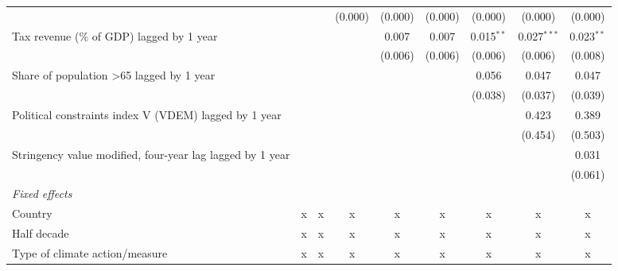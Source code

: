 \begin{tabular}{lcccccccc}
                                                                     &              &              & (0.000)      & (0.000) & (0.000) & (0.000)        & (0.000)        & (0.000)\\   
   Tax revenue (\% of GDP) lagged by 1 year                          &              &              &              & 0.007   & 0.007   & 0.015$^{**}$   & 0.027$^{***}$  & 0.023$^{**}$\\   
                                                                     &              &              &              & (0.006) & (0.006) & (0.006)        & (0.006)        & (0.008)\\   
   Share of population >65 lagged by 1 year                          &              &              &              &         &         & 0.056          & 0.047          & 0.047\\   
                                                                     &              &              &              &         &         & (0.038)        & (0.037)        & (0.039)\\   
   Political constraints index V (VDEM) lagged by 1 year             &              &              &              &         &         &                & 0.423          & 0.389\\   
                                                                     &              &              &              &         &         &                & (0.454)        & (0.503)\\   
   Stringency value modified, four-year lag lagged by 1 year         &              &              &              &         &         &                &                & 0.031\\   
                                                                     &              &              &              &         &         &                &                & (0.061)\\   
   \emph{Fixed effects}\\
   Country                                                           & x            & x            & x            & x       & x       & x              & x              & x\\  
   Half decade                                                       & x            & x            & x            & x       & x       & x              & x              & x\\  
   Type of climate action/measure                                    & x            & x            & x            & x       & x       & x              & x              & x\\  

\end{tabular}
